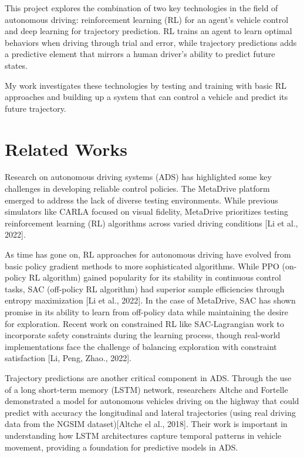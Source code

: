 \documentclass[10pt]{IEEEtran}
\begin{document}
This project explores the combination of two key technologies in the field of autonomous driving: reinforcement learning (RL) for an agent's vehicle control and deep learning for trajectory prediction. RL trains an agent to learn optimal behaviors when driving through trial and error, while trajectory predictions adds a predictive element that mirrors a human driver's ability to predict future states.

My work investigates these technologies by testing and training with basic RL approaches and building up a system that can control a vehicle and predict its future trajectory.

\section{Related Works}
Research on autonomous driving systems (ADS) has highlighted some key challenges in developing reliable control policies. The MetaDrive platform emerged to address the lack of diverse testing environments. While previous simulators like CARLA focused on visual fidelity, MetaDrive prioritizes testing reinforcement learning (RL) algorithms across varied driving conditions [Li et al., 2022].

As time has gone on, RL approaches for autonomous driving have evolved from basic policy gradient methods to more sophisticated algorithms. While PPO (on-policy RL algorithm) gained popularity for its stability in continuous control tasks, SAC (off-policy RL algorithm) had superior sample efficiencies through entropy maximization [Li et al., 2022].  In the case of MetaDrive, SAC has shown promise in its ability to learn from off-policy data while maintaining the desire for exploration. Recent work on constrained RL like SAC-Lagrangian work to incorporate safety constraints during the learning process, though real-world implementations face the challenge of balancing exploration with constraint satisfaction [Li, Peng, Zhao., 2022].

Trajectory predictions are another critical component in ADS. Through the use of a long short-term memory (LSTM) network, researchers Altche and Fortelle demonstrated a model for autonomous vehicles driving on the highway that could predict with accuracy the longitudinal and lateral trajectories (using real driving data from the NGSIM dataset)[Altche el al., 2018]. Their work is important in understanding how LSTM architectures capture temporal patterns in vehicle movement, providing a foundation for predictive models in ADS.
\end{document}
